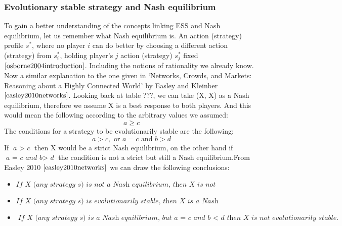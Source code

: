 \documentclass{book}
\begin{document}
\subsubsection{Evolutionary stable strategy and Nash equilibrium} \label{EESNE}
To gain a better understanding of the concepts linking ESS and Nash equilibrium, let us remember what Nash equilibrium is. 
An action (strategy) profile $s^*$, where no player $\textit{i}$ can do better by choosing a different action (strategy) from $s^*_i$, holding player’s $\textit{j}$ action (strategy) $s^*_{j}$ fixed $\cite{osborne2004introduction}$.  Including the notions of rationality we already know.   
Now a similar explanation to the one given in ‘Networks, Crowds, and Markets: Reasoning about a Highly Connected World’ by Easley and Kleinber$\cite{easley2010networks}$.
Looking back at table ???, we can take (X, X) as a Nash equilibrium, therefore we assume X is a best response to both players. And this would mean the following according to the arbitrary values we assumed:
\begin{equation}
{a \geq c}
\end{equation}
The conditions for a strategy to be evolutionarily stable are the following:
\begin{equation}
{a > c, \text{ or } a = c \text{ and } b > d}
\end{equation}
If $\textit{a $>$ c}$ then X would be a strict Nash equilibrium, on the other hand if $\textit{a = c and b$>$ d}$ the condition is not a strict but still a Nash equilibrium.From Easley 2010 $\cite{easley2010networks}$ we can draw the following conclusions:

\begin{itemize}
\item $\textit{If X (any strategy s) is not a Nash equilibrium, then X is not evolutionarily stable.}$ 
\item $\textit{If X (any strategy s) is evolutionarily stable, then X is a Nash equilibrium.}$ 
\item $\textit{If X (any strategy s) is a Nash equilibrium, but  $\textit{a = c and b $<$ d}$ then X is not evolutionarily stable.}$
\end{itemize}
\end{document}
